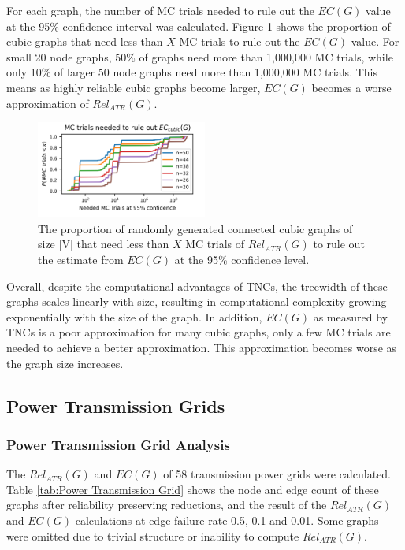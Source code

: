 \documentclass[12pt,twocolumn]{article}
\begin{document}
For each graph, the number of MC trials needed to rule out the \(EC(G)\) value at the 95\% confidence interval was calculated. Figure \ref{fig:Random Cubic MC} shows the proportion of cubic graphs that need less than \(X\) MC trials to rule out the \(EC(G)\) value. For small 20 node graphs, 50\% of graphs need more than 1,000,000 MC trials, while only 10\% of larger 50 node graphs need more than 1,000,000 MC trials. This means as highly reliable cubic graphs become larger, \(EC(G)\) becomes a worse approximation of \(Rel_{ATR}(G)\).

\begin{figure}[t]
\caption{The proportion of randomly generated connected cubic graphs of size |V| that need less than $X$ MC trials of $Rel_{ATR}(G)$ to rule out the estimate from $EC(G)$ at the 95\% confidence level.}
\label{fig:Random Cubic MC}
\includegraphics[width=0.5\textwidth]{../figures/RcubicTrials.png}
\end{figure}

Overall, despite the computational advantages of TNCs, the treewidth of these graphs scales linearly with size, resulting in computational complexity growing exponentially with the size of the graph. In addition, \(EC(G)\) as measured by TNCs is a poor approximation for many cubic graphs, only a few MC trials are needed to achieve a better approximation. This approximation becomes worse as the graph size increases.

\hypertarget{power-transmission-grids}{%
\subsection{Power Transmission Grids}\label{power-transmission-grids}}

\hypertarget{power-transmission-grid-analysis}{%
\subsubsection{Power Transmission Grid Analysis}\label{power-transmission-grid-analysis}}

The \(Rel_{ATR}(G)\) and \(EC(G)\) of 58 transmission power grids \cite{li2016characterizing} were calculated. Table \ref{tab:Power Transmission Grid} shows the node and edge count of these graphs after reliability preserving reductions, and the result of the \(Rel_{ATR}(G)\) and \(EC(G)\) calculations at edge failure rate 0.5, 0.1 and 0.01. Some graphs were omitted due to trivial structure or inability to compute \(Rel_{ATR}(G)\).
\end{document}
